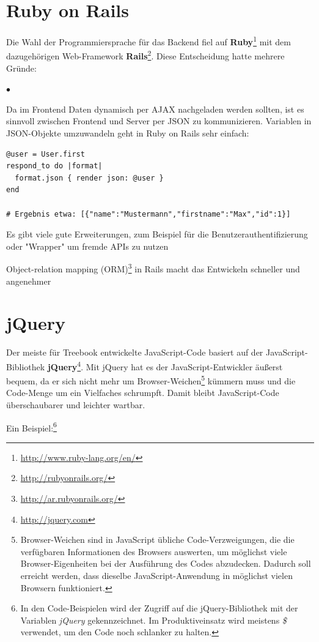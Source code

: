 \documentclass[10pt,a4paper]{book}
\begin{document}
\section{Ruby on Rails}
Die Wahl der Programmiersprache für das Backend fiel auf \textbf{Ruby}\footnote{\href{http://www.ruby-lang.org/en/}{http://www.ruby-lang.org/en/}} mit dem dazugehörigen Web-Framework \textbf{Rails}\footnote{\href{http://rubyonrails.org/}{http://rubyonrails.org/}}. Diese Entscheidung hatte mehrere Gründe:
\lstset{language=Ruby}
\begin{list}{$\bullet$}{}
\item Da im Frontend Daten dynamisch per AJAX nachgeladen werden sollten, ist es sinnvoll zwischen Frontend und Server per JSON zu kommunizieren. Variablen in JSON-Objekte umzuwandeln geht in Ruby on Rails sehr einfach:
\begin{lstlisting}
@user = User.first
respond_to do |format|
  format.json { render json: @user }
end

# Ergebnis etwa: [{"name":"Mustermann","firstname":"Max","id":1}]
\end{lstlisting}
\item Es gibt viele gute Erweiterungen, zum Beispiel für die Benutzerauthentifizierung oder "Wrapper" um fremde APIs zu nutzen
\item Object-relation mapping (ORM)\footnote{\href{http://ar.rubyonrails.org/}{http://ar.rubyonrails.org/}} in Rails macht das Entwickeln schneller und angenehmer
\end{list}

\section{jQuery}
Der meiste für Treebook entwickelte JavaScript-Code basiert auf der JavaScript-Bibliothek \textbf{jQuery}\footnote{\href{http://jquery.com}{http://jquery.com}}. Mit jQuery hat es der JavaScript-Entwickler äußerst bequem, da er sich nicht mehr um Browser-Weichen\footnote{Browser-Weichen sind in JavaScript übliche Code-Verzweigungen, die die verfügbaren Informationen des Browsers auswerten, um möglichst viele Browser-Eigenheiten bei der Ausführung des Codes abzudecken. Dadurch soll erreicht werden, dass dieselbe JavaScript-Anwendung in möglichst vielen Browsern funktioniert.} kümmern muss und die Code-Menge um ein Vielfaches schrumpft. Damit bleibt JavaScript-Code überschaubarer und leichter wartbar.

Ein Beispiel:\footnote{In den Code-Beispielen wird der Zugriff auf die jQuery-Bibliothek mit der Variablen \textit{jQuery} gekennzeichnet. Im Produktiveinsatz wird meistens \textit{\$} verwendet, um den Code noch schlanker zu halten.}
\end{document}
